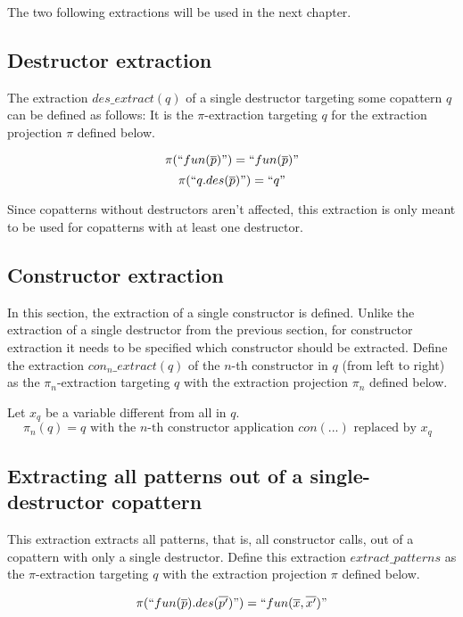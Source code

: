 The two following extractions will be used in the next chapter.

\subsection{Destructor extraction}

The extraction $des\_extract(q)$ of a single destructor targeting some copattern $q$ can be defined as follows: It is the $\pi$-extraction targeting $q$ for the extraction projection $\pi$ defined below.

\[
\pi(`` fun(\overline{p}) ") = `` fun(\overline{p}) "
\]
\[
\pi(`` q.des(\overline{p}) ") = `` q "
\]

Since copatterns without destructors aren't affected, this extraction is only meant to be used for copatterns with at least one destructor. 

\subsection{Constructor extraction}

In this section, the extraction of a single constructor is defined. Unlike the extraction of a single destructor from the previous section, for constructor extraction it needs to be specified which constructor should be extracted. Define the extraction $con_n\_extract(q)$ of the $n$-th constructor in $q$ (from left to right) as the $\pi_n$-extraction targeting $q$ with the extraction projection $\pi_n$ defined below.

Let $x_q$ be a variable different from all in $q$.
\[
\pi_n(q) = q \text{ with the $n$-th constructor application } con(...) \text{ replaced by $x_q$ }
\]

\subsection{Extracting all patterns out of a single-destructor copattern}

This extraction extracts all patterns, that is, all constructor calls, out of a copattern with only a single destructor. Define this extraction $extract\_patterns$ as the $\pi$-extraction targeting $q$ with the extraction projection $\pi$ defined below.

\[
\pi(`` fun(\overline{p}).des(\overline{p'}) ") = `` fun(\overline{x}, \overline{x'}) "
\]
